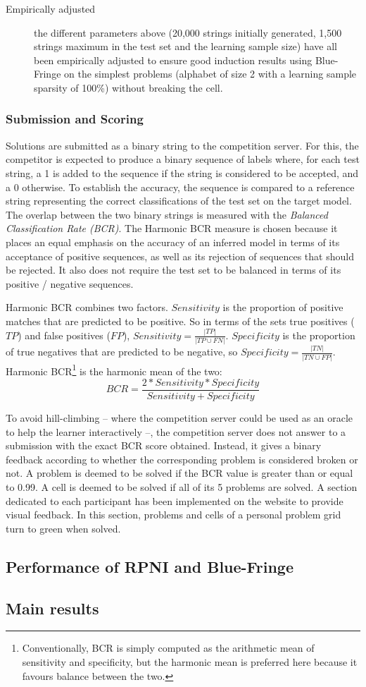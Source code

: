 \begin{description}
\item[Empirically adjusted] the different parameters above (20,000 strings initially generated, 1,500 strings maximum in the test set and the learning sample size) have all been empirically adjusted to ensure good induction results using Blue-Fringe on the simplest problems (alphabet of size 2 with a learning sample sparsity of 100\%) without breaking the cell.

\end{description}

\subsubsection{Submission and Scoring}

Solutions are submitted as a binary string to the competition server. For this, the competitor is expected to produce a binary sequence of labels where, for each test string, a 1 is added to the sequence if the string is considered to be accepted, and a 0 otherwise. To establish the accuracy, the sequence is compared to a reference string representing the correct classifications of the test set on the target model. The overlap between the two binary strings is measured with the \emph{Balanced Classification Rate (BCR)}. The Harmonic BCR measure is chosen because it places an equal emphasis on the accuracy of an inferred model in terms of its acceptance of positive sequences, as well as its rejection of sequences that should be rejected. It also does not require the test set to be balanced in terms of its positive / negative sequences. 

Harmonic BCR combines two factors. $Sensitivity$ is the proportion of positive matches that are predicted to be positive. So in terms of the sets true positives ($TP$) and false positives ($FP$), $Sensitivity=\frac{|TP|}{|TP \cup FN|}$. $Specificity$ is the proportion of true negatives that are predicted to be negative, so $Specificity=\frac{|TN|}{|TN \cup FP|}$. Harmonic BCR\footnote{Conventionally, BCR is simply computed as the arithmetic mean of sensitivity and specificity, but the harmonic mean is preferred here because it favours balance between the two.} is the harmonic mean of the two: $$BCR=\frac{2*Sensitivity*Specificity}{Sensitivity + Specificity}$$

To avoid hill-climbing -- where the competition server could be used as an oracle to help the learner interactively --, the competition server does not answer to a submission with the exact BCR score obtained. Instead, it gives a binary feedback according to whether the corresponding problem is considered broken or not. A problem is deemed to be solved if the BCR value is greater than or equal to 0.99. A cell is deemed to be solved if all of its 5 problems are solved. A section dedicated to each participant has been implemented on the website to provide visual feedback. In this section, problems and cells of a personal problem grid turn to green when solved.

\subsection{Performance of RPNI and Blue-Fringe\label{subsection_stamina_baseline}}

\subsection{Main results\label{subsection_stamina_results}}

